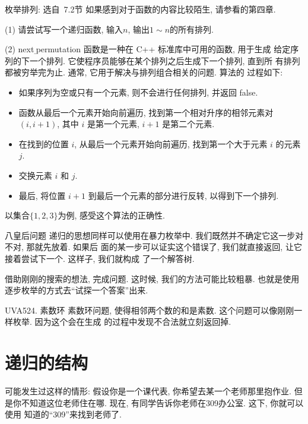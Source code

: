     \begin{exercise}{枚举排列: 选自\cite{liu2014}~7.2节}
        如果感到对于函数的内容比较陌生, 请参看\cite{liu2014}的第四章. 
        
        (1) 请尝试写一个递归函数, 输入$n$, 输出$1\sim n$的所有排列. 

        (2) next$\underline~$permutation 函数是一种在 C++ 标准库中可用的函数, 用于生成
        给定序列的下一个排列. 它使程序员能够在某个排列之后生成下一个排列, 直到所
        有排列都被穷举完为止. 通常, 它用于解决与排列组合相关的问题. 算法的
        过程如下: 
        \begin{itemize}[noitemsep]
            \item 如果序列为空或只有一个元素, 则不会进行任何排列, 并返回 false. 
            \item 函数从最后一个元素开始向前遍历, 找到第一个相对升序的相邻元素对 $(i, i+1)$, 其中 $i$ 是第一个元素, $i+1$ 是第二个元素. 
            \item 在找到的位置 $i$, 从最后一个元素开始向前遍历, 找到第一个大于元素 $i$ 的元素 $j$. 
            \item 交换元素 $i$ 和 $j$. 
            \item 最后, 将位置 $i+1$ 到最后一个元素的部分进行反转, 以得到下一个排列. 
        \end{itemize}
        以集合$\{1,2,3\}$为例, 感受这个算法的正确性. 
    \end{exercise}

\begin{exercise}{八皇后问题}
    递归的思想同样可以使用在暴力枚举中. 我们既然并不确定它这一步对不对, 那就先放着. 如果后
    面的某一步可以证实这个错误了, 我们就直接返回, 让它接着尝试下一个. 这样子, 我们就构成
    了一个解答树. 
    
    借助刚刚的搜索的想法, 完成问题. 这时候, 我们的方法可能比较粗暴. 
    也就是使用逐步枚举的方式去``试探一个答案''出来. 
\end{exercise}

\begin{exercise}{UVA524. 素数环}
    素数环问题, 使得相邻两个数的和是素数. 这个问题可以像刚刚一样枚举. 因为这个会在生成
    的过程中发现不合法就立刻返回掉. 
\end{exercise}

\section{递归的结构}

 可能发生过这样的情形: 假设你是一个课代表, 你希望去某一个老师那里抱作业. 
但是你不知道这位老师住在哪. 现在, 有同学告诉你老师在309办公室. 这下, 你就可以使用
知道的``309''来找到老师了. 

